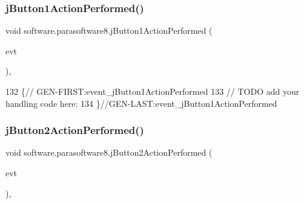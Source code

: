 \mbox{\label{classsoftware_1_1parasoftware8_ac91bc1f9d8500c52e17769d1dcecec5b}} 
\subsubsection{\texorpdfstring{j\+Button1\+Action\+Performed()}{jButton1ActionPerformed()}}
{\footnotesize\ttfamily void software.\+parasoftware8.\+j\+Button1\+Action\+Performed (\begin{DoxyParamCaption}\item[{java.\+awt.\+event.\+Action\+Event}]{evt }\end{DoxyParamCaption})\hspace{0.3cm}{\ttfamily [inline]}, {\ttfamily [private]}}


\begin{DoxyCode}
132                                                                          \{\textcolor{comment}{//
      GEN-FIRST:event\_jButton1ActionPerformed}
133         \textcolor{comment}{// TODO add your handling code here:}
134     \}\textcolor{comment}{//GEN-LAST:event\_jButton1ActionPerformed}
\end{DoxyCode}
\mbox{\label{classsoftware_1_1parasoftware8_ab4ed9002057b4f91e7e73b08cae6e8f6}} 
\subsubsection{\texorpdfstring{j\+Button2\+Action\+Performed()}{jButton2ActionPerformed()}}
{\footnotesize\ttfamily void software.\+parasoftware8.\+j\+Button2\+Action\+Performed (\begin{DoxyParamCaption}\item[{java.\+awt.\+event.\+Action\+Event}]{evt }\end{DoxyParamCaption})\hspace{0.3cm}{\ttfamily [inline]}, {\ttfamily [private]}}


